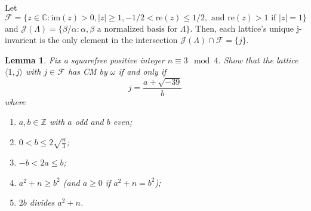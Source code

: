 \documentclass[12pt]{amsart}
\newtheorem{lemma}[theorem]{Lemma}
\theoremstyle{definition}
\theoremstyle{remark}
\begin{document}
Let $\mathcal{F} = \{z\in\mathbb{C} : \text{im}(z) > 0, |z| \geq 1, -1/2 < \text{re}(z) \leq 1/2, \text{ and } \text{re}(z) > 1 \text{ if } |z|=1 \}$ and $\mathcal{J}(\Lambda) = \{\beta/\alpha : \alpha, \beta \text{ a normalized basis for } \Lambda\}$. Then, each lattice's unique j-invarient is the only element in the intersection $\mathcal{J}(\Lambda) \cap \mathcal{F} = \{ j\}$.
\begin{lemma}
    Fix a squarefree positive integer $n \equiv 3 \mod 4$. Show that the lattice $\langle1,j\rangle$ with $j \in \mathcal{F}$ has CM by $\omega$ if and only if
$$j = \frac{a + \sqrt{-39}}{b}$$
where
\begin{enumerate}
    \item $a,b\in\mathbb{Z}$ with $a$ odd and $b$ even;
    \item $0<b\leq 2\sqrt{\frac{n}{3}}$;
    \item $-b < 2a\leq b$;
    \item $a^2+n\geq b^2$  (and $a\geq 0$ if $a^2+n=b^2$); 
    \item $2b$ divides $a^2 + n$.
\end{enumerate}
\end{lemma}
\end{document}
